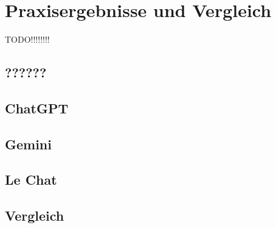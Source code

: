 
\chapter{Praxisergebnisse und Vergleich} 

TODO!!!!!!!!

\section{??????}  \label{????}

\section{ChatGPT}  \label{ChatGPT}

\section{Gemini}  \label{Gemini}

\section{Le Chat}  \label{Le Chat}

\section{Vergleich}  \label{Vergleich}